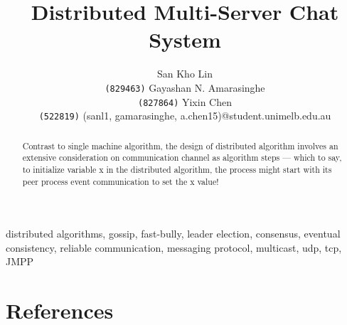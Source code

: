 \documentclass[11pt]{article}
\title{Distributed Multi-Server Chat System}
\author{San Kho Lin \\ \texttt{(829463)} \And
Gayashan N. Amarasinghe \\ \texttt{(827864)} \And
Yixin Chen \\ \texttt{(522819)} \AND
(sanl1, gamarasinghe, a.chen15)@student.unimelb.edu.au}
\begin{document}
\maketitle



\begin{abstract}
Contrast to single machine algorithm, the design of distributed algorithm involves an extensive consideration on communication channel as algorithm steps --- which to say, to initialize variable x in the distributed algorithm, the process might start with its peer process event communication to set the x value!
\end{abstract}

\begin{keywords} 
distributed algorithms, gossip, fast-bully, leader election, consensus, eventual consistency, reliable communication, messaging protocol, multicast, udp, tcp, JMPP
\end{keywords}












\newpage

%




\newpage

\section{References}

\printbibliography[nottype=online,heading=subbibliography,title={Paper and Printed Sources}]
\printbibliography[type=online,heading=subbibliography,title={Online Sources}]



%
\end{document}

